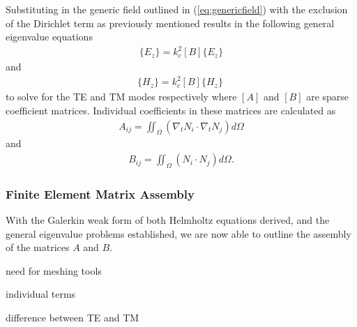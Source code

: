 Substituting in the generic field outlined in (\ref{eq:genericfield}) with the exclusion of the Dirichlet term as previously mentioned results in the following general eigenvalue equations
\begin{align}
	[A]\{E_z\}=k^2_c[B]\{E_z\}
	\label{eq:te_eig}
\end{align}
and
\begin{align}
	[A]\{H_z\}=k^2_c[B]\{H_z\}\
	\label{eq:tm_eig}
\end{align}
to solve for the TE and TM modes respectively where $[A]$ and $[B]$ are sparse coefficient matrices. Individual coefficients in these matrices are calculated as
\begin{align}
	A_{ij}=\iint_\Omega\left(\nabla_tN_i\cdot\nabla_tN_j\right)d\Omega
	\label{eq:a_int}
\end{align}
and
\begin{align}
	B_{ij}=\iint_\Omega\left(N_i \cdot N_j\right)d\Omega.
	\label{eq:b_int}
\end{align}

\subsubsection{Finite Element Matrix Assembly}
\label{subsub:mat_assembly}
With the Galerkin weak form of both Helmholtz equations derived, and the general eigenvalue problems established, we are now able to outline the assembly of the matrices $A$ and $B$.

need for meshing tools

individual terms

difference between TE and TM